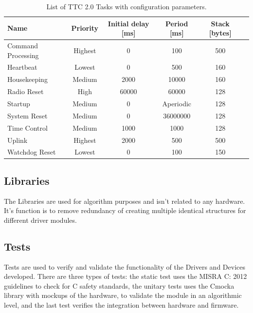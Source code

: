 \begin{table}[!h]
    \centering

    \begin{tabular}{lccccc}
        \toprule[1.5pt]
        \textbf{Name}          & \textbf{Priority} & \textbf{Initial delay [ms]} & \textbf{Period [ms]} & \textbf{Stack [bytes]} \\
        \midrule
        Command Processing     & Highest & 0     & 100       & 500 \\
        Heartbeat              & Lowest  & 0     & 500       & 160 \\
        Housekeeping           & Medium  & 2000  & 10000     & 160 \\
        Radio Reset            & High    & 60000 & 60000     & 128 \\
        Startup                & Medium  & 0     & Aperiodic & 128 \\
        System Reset           & Medium  & 0     & 36000000  & 128 \\
        Time Control           & Medium  & 1000  & 1000      & 128 \\
        Uplink                 & Highest & 2000  & 500       & 500 \\
        Watchdog Reset         & Lowest  & 0     & 100       & 150 \\
        \bottomrule[1.5pt]
    \end{tabular}
    \caption{List of TTC 2.0 Tasks with configuration parameters.}
    \label{tab:firmware-tasks}
\end{table}

\subsection{Libraries}

The Libraries are used for algorithm purposes and isn't related to any hardware. It's function is to remove redundancy of creating multiple identical structures for different driver modules.

\subsection{Tests}

Tests are used to verify and validate the functionality of the Drivers and Devices developed. There are three types of tests: the static test uses the MISRA C: 2012 \cite{misra} guidelines to check for C safety standards, the unitary tests uses the Cmocka library \cite{cmocka} with mockups of the hardware, to validate the module in an algorithmic level, and the last test verifies the integration between hardware and firmware.
